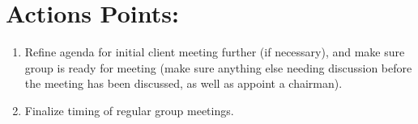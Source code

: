 \documentclass{article}
\begin{document}
\section{Actions Points:}
\begin{enumerate}
\item Refine agenda for initial client meeting further (if necessary), and make sure group is ready for meeting (make sure anything else needing discussion before the meeting has been discussed, as well as appoint a chairman).
\item Finalize timing of regular group meetings.
\end{enumerate}
\end{document}
